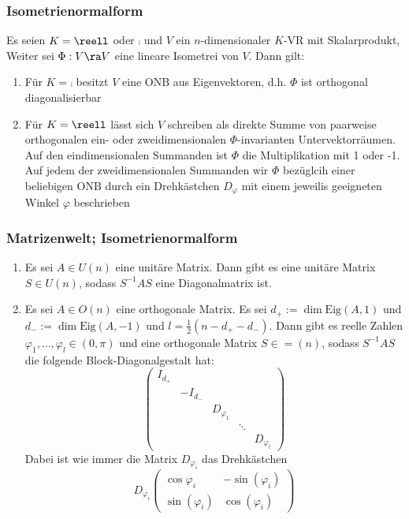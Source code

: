 \documentclass{kit}
\begin{document}
    \subsubsection{Isometrienormalform}
      Es seien $K=\reell$ oder $\comp$ und $V$ ein $n$-dimensionaler $K$-VR mit Skalarprodukt, Weiter sei $\Phi:V\ra V$ eine
      lineare Isometrei von $V$. Dann gilt:
      \begin{enumerate}
        \item Für $K=\comp$ besitzt $V$ eine ONB aus Eigenvektoren, d.h. $\Phi$ ist orthogonal diagonalisierbar
        \item Für $K=\reell$ lässt sich $V$ schreiben als direkte Summe von paarweise orthogonalen ein- oder
          zweidimensionalen $\Phi$-invarianten Untervektorräumen. Auf den eindimensionalen Summanden ist $\Phi$ die 
          Multiplikation mit 1 oder -1. Auf jedem der zweidimensionalen Summanden wir $\Phi$ bezüglcih einer beliebigen ONB
          durch ein Drehkästchen $D_\varphi$ mit einem jeweilis geeigneten Winkel $\varphi$ beschrieben
      \end{enumerate}
    \subsubsection{Matrizenwelt; Isometrienormalform}
      \begin{enumerate}
        \item Es sei $A\in U(n)$ eine unitäre Matrix. Dann gibt es eine unitäre Matrix $S\in U(n)$, sodass $S^{-1}AS$ eine
          Diagonalmatrix ist.
        \item Es sei $A\in O(n)$ eine orthogonale Matrix. Es sei $d_+:=\dim\text{Eig}(A,1)$ und $d_-:=\dim\text{Eig}(A,-1)$
          und $l=\frac{1}{2}(n-d_+-d_-)$. Dann gibt es reelle Zahlen $\varphi_1,\dots,\varphi_l\in(0,\pi)$ und eine
          orthogonale Matrix $S\in =(n)$, sodass $S^{-1}AS$ die folgende Block-Diagonalgestalt hat:
          $$\begin{pmatrix}
            I_{d_+} & & & & \\
             & -I_{d_-} & & & \\
             & & D_{\varphi_1} & & \\
             & & & \ddots & \\
             & & & & D_{\varphi_l}
          \end{pmatrix}$$
          Dabei ist wie immer die Matrix $D_{\varphi_i}$ das Drehkästchen
          $$D_{\varphi_i}\begin{pmatrix}
            \cos{\varphi_i} & -\sin(\varphi_i) \\
            \sin(\varphi_i) & \cos(\varphi_i)
          \end{pmatrix}$$
      \end{enumerate}
\end{document}
